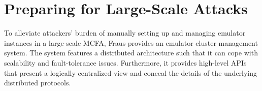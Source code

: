 \documentclass[conference]{IEEEtranl}
\begin{document}


	\section{Preparing for Large-Scale Attacks}\label{deploymentarch}
	To alleviate attackers' burden of manually setting up and managing emulator instances in a large-scale MCFA, 
	Fraus provides an emulator cluster management system. The system features a distributed architecture such that it can cope with scalability and fault-tolerance issues. Furthermore, it provides high-level APIs that present a logically centralized view and conceal the details of the underlying distributed protocols.
\end{document}
